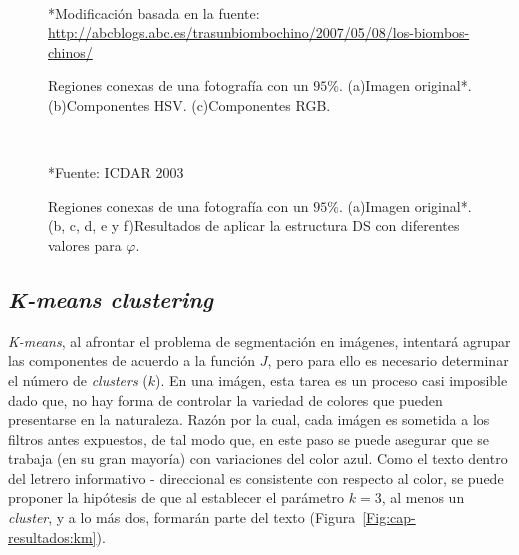 \begin{figure}[h!]
  \centering
   \\
   { }
  \caption[Regiones conexas de una fotografía]{Regiones conexas de una
  fotografía con un $95\%$. (a)Imagen original*. (b)Componentes HSV.
(c)Componentes RGB.}\tiny{*Modificación basada en la fuente:
\url{http://abcblogs.abc.es/trasunbiombochino/2007/05/08/los-biombos-chinos/}}
  \label{Fig:cap-resultados:Components-letrerochino}
\end{figure}

\clearpage
\begin{figure}[h!]
  \centering
   { }
   { }
   \\
   { }
   { }
  \caption[Regiones conexas de una fotografía]{Regiones conexas de una 
  fotografía con un $95\%$. (a)Imagen original*. (b, c, d, e y f)Resultados de
aplicar la estructura DS con diferentes valores para $\varphi$.}\tiny{*Fuente:
ICDAR 2003}
  \label{Fig:cap-resultados:Components-cs}
\end{figure}

\subsection{\textit{K-means clustering}}
\textit{K-means}, al afrontar el problema de segmentación en imágenes, intentará
agrupar las componentes de acuerdo a la función $J$, pero para ello es necesario
determinar el número de \textit{clusters} ($k$). En una imágen, esta tarea es un
proceso casi imposible dado que, no hay forma de controlar la variedad de
colores que pueden presentarse en la naturaleza. Razón por la cual, cada imágen
es sometida a los filtros antes expuestos, de tal modo que, en este paso se
puede asegurar que se trabaja (en su gran mayoría) con variaciones del color
azul. Como el texto dentro del letrero informativo - direccional es consistente
con respecto al color, se puede proponer la hipótesis de que al establecer el
parámetro $k=3$, al menos un \textit{cluster}, y a lo más dos, formarán parte
del texto (Figura~\ref{Fig:cap-resultados:km}).

